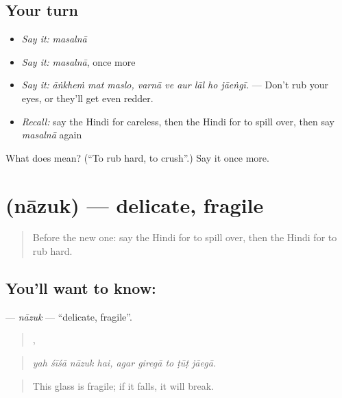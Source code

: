 \subsection*{Your turn}
\begin{itemize}
\raggedright
  \item \emph{Say it:} \emph{masalnā}
  \item \emph{Say it:} \emph{masalnā}, once more
  \item \emph{Say it:} \emph{āṅkheṁ mat maslo, varnā ve aur lāl ho jāeṅgī.} — Don't rub your eyes, or they'll get even redder.
  \item \emph{Recall:} say the Hindi for careless, then the Hindi for to spill over, then say \emph{masalnā} again
\end{itemize}

\begin{tcolorbox}[breakable,colback=teal!4,colframe=teal!35!black,title={Before you move on}]
What does  mean? (\textquotedblleft{}To rub hard, to crush\textquotedblright{}.) Say it once more.
\end{tcolorbox}
\section[\texorpdfstring{\hi{नाज़ुक} (nāzuk)}{नाज़ुक (nāzuk)}]{ (nāzuk) — delicate, fragile}

\label{lesson:HI-C382-nazuk}



\begin{quote}
Before the new one: say the Hindi for to spill over, then the Hindi for to rub hard.
\end{quote}

\subsection*{You'll want to know: }
\textbf{} — \emph{nāzuk} — \textquotedblleft{}delicate, fragile\textquotedblright{}.

\begin{quote}
   ,     
\end{quote}

\begin{quote}
\emph{yah śīśā nāzuk hai, agar giregā to ṭūṭ jāegā.}
\end{quote}

\begin{quote}
This glass is fragile; if it falls, it will break.
\end{quote}

